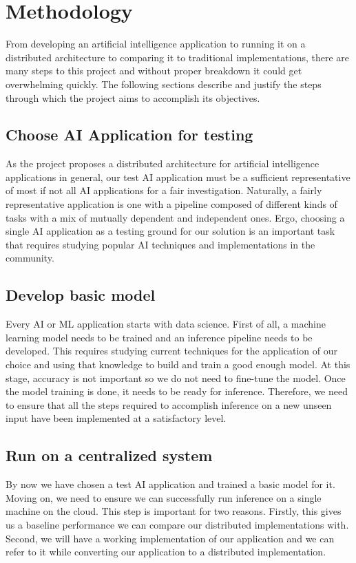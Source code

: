 \documentclass{report}
\begin{document}
\chapter{Methodology}\label{chap:methodology}

From developing an artificial intelligence application to running it on a distributed architecture to comparing it to traditional implementations, there are many steps to this project and without proper breakdown it could get overwhelming quickly.
The following sections describe and justify the steps through which the project aims to accomplish its objectives.

\section{Choose AI Application for testing}
As the project proposes a distributed architecture for artificial intelligence applications in general, our test AI application must be a sufficient representative of most if not all AI applications for a fair investigation. Naturally, a fairly representative application is one with a pipeline composed of different kinds of tasks with a mix of mutually dependent and independent ones. Ergo, choosing a single AI application as a testing ground for our solution is an important task that requires studying popular AI techniques and implementations in the community.

\section{Develop basic model}
Every AI or ML application starts with data science.
First of all, a machine learning model needs to be trained and an inference pipeline needs to be developed.
This requires studying current techniques for the application of our choice and using that knowledge to build and train a good enough model.
At this stage, accuracy is not important so we do not need to fine-tune the model.
Once the model training is done, it needs to be ready for inference.
Therefore, we need to ensure that all the steps required to accomplish inference on a new unseen input have been implemented at a satisfactory level.

\section{Run on a centralized system}
By now we have chosen a test AI application and trained a basic model for it. Moving on, we need to ensure we can successfully run inference on a single machine on the cloud. This step is important for two reasons. Firstly, this gives us a baseline performance we can compare our distributed implementations with. Second, we will have a working implementation of our application and we can refer to it while converting our application to a distributed implementation.
\end{document}
